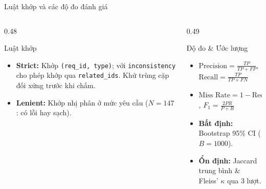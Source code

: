 \documentclass[aspectratio=169,10pt]{beamer}
\begin{document}
\begin{frame}{Luật khớp và các độ đo đánh giá}
  \begin{columns}[T]
    \begin{column}{0.48\textwidth}
      \begin{block}{Luật khớp}
        \begin{itemize}
          \item \textbf{Strict:} Khớp \texttt{(req\_id, type)}; với \texttt{inconsistency} cho phép khớp qua \texttt{related\_ids}. Khử trùng cặp đối xứng trước khi chấm.
          \item \textbf{Lenient:} Khớp nhị phân ở mức yêu cầu ($N = 147$: có lỗi hay sạch).
        \end{itemize}
      \end{block}
    \end{column}
    \begin{column}{0.49\textwidth}
      \begin{block}{Độ đo \& Ước lượng}
        \begin{itemize}
          \item $\text{Precision} = \frac{TP}{TP+FP}$, \quad $\text{Recall} = \frac{TP}{TP+FN}$
          \item $\text{Miss Rate} = 1 - \text{Recall}$, \quad $F_1 = \frac{2PR}{P+R}$
          \item \textbf{Bất định:} Bootstrap 95\% CI ($B = 1000$).
          \item \textbf{Ổn định:} Jaccard trung bình \& Fleiss' $\kappa$ qua 3 lượt.
        \end{itemize}
      \end{block}
    \end{column}
  \end{columns}
\end{frame}
\end{document}
